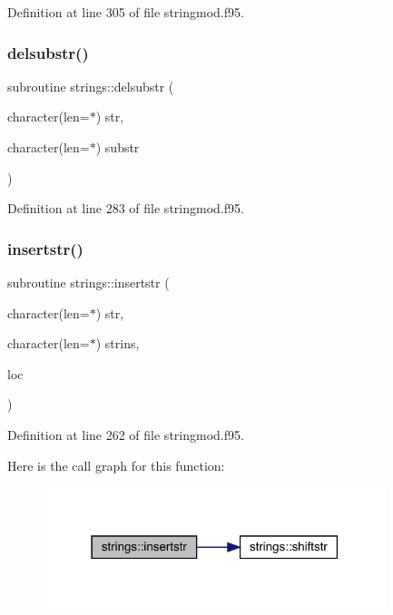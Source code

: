 Definition at line 305 of file stringmod.\+f95.

\mbox{\label{namespacestrings_ae1241e2ce69da61233e5dd7d98418d21}} 
\subsubsection{\texorpdfstring{delsubstr()}{delsubstr()}}
{\footnotesize\ttfamily subroutine strings\+::delsubstr (\begin{DoxyParamCaption}\item[{character(len=$\ast$)}]{str,  }\item[{character(len=$\ast$)}]{substr }\end{DoxyParamCaption})}



Definition at line 283 of file stringmod.\+f95.

\mbox{\label{namespacestrings_a088c9da339db232b73bcb1f4da4fe5a2}} 
\subsubsection{\texorpdfstring{insertstr()}{insertstr()}}
{\footnotesize\ttfamily subroutine strings\+::insertstr (\begin{DoxyParamCaption}\item[{character(len=$\ast$)}]{str,  }\item[{character(len=$\ast$)}]{strins,  }\item[{}]{loc }\end{DoxyParamCaption})}



Definition at line 262 of file stringmod.\+f95.

Here is the call graph for this function\+:\nopagebreak
\begin{figure}[H]
\begin{center}
\leavevmode
\includegraphics[width=283pt]{namespacestrings_a088c9da339db232b73bcb1f4da4fe5a2_cgraph}
\end{center}
\end{figure}
\mbox{\label{namespacestrings_a91d4d50cfe3e624152f5234d89aa6dc5}} 
